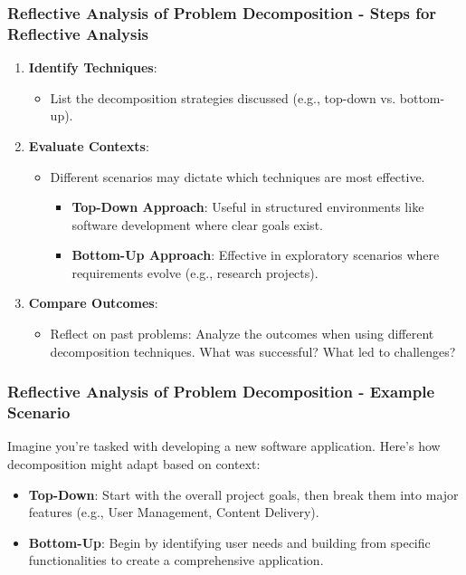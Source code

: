 \documentclass[aspectratio=169]{beamer}
\begin{document}
\begin{frame}[fragile]
    \frametitle{Reflective Analysis of Problem Decomposition - Steps for Reflective Analysis}
    \begin{enumerate}
        \item \textbf{Identify Techniques}:
        \begin{itemize}
            \item List the decomposition strategies discussed (e.g., top-down vs. bottom-up).
        \end{itemize}
        \item \textbf{Evaluate Contexts}:
        \begin{itemize}
            \item Different scenarios may dictate which techniques are most effective. 
            \begin{itemize}
                \item \textbf{Top-Down Approach}: Useful in structured environments like software development where clear goals exist.
                \item \textbf{Bottom-Up Approach}: Effective in exploratory scenarios where requirements evolve (e.g., research projects).
            \end{itemize}
        \end{itemize}
        \item \textbf{Compare Outcomes}:
        \begin{itemize}
            \item Reflect on past problems: Analyze the outcomes when using different decomposition techniques. What was successful? What led to challenges?
        \end{itemize}
    \end{enumerate}
\end{frame}

\begin{frame}[fragile]
    \frametitle{Reflective Analysis of Problem Decomposition - Example Scenario}
    Imagine you're tasked with developing a new software application. Here’s how decomposition might adapt based on context:
    
    \begin{itemize}
        \item \textbf{Top-Down}: Start with the overall project goals, then break them into major features (e.g., User Management, Content Delivery).
        \item \textbf{Bottom-Up}: Begin by identifying user needs and building from specific functionalities to create a comprehensive application.
    \end{itemize}
\end{frame}
\end{document}
